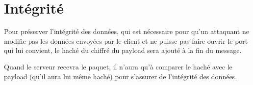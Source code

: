 \chapter{Intégrité}

Pour préserver l'intégrité des données, qui est nécessaire pour qu'un attaquant ne modifie pas les données envoyées par le client et ne puisse pas faire ouvrir le port qui lui convient, le haché du chiffré du payload sera ajouté à la fin du message.

Quand le serveur recevra le paquet, il n'aura qu'à comparer le haché avec le payload (qu'il aura lui même haché) pour s'assurer de l'intégrité des données.
